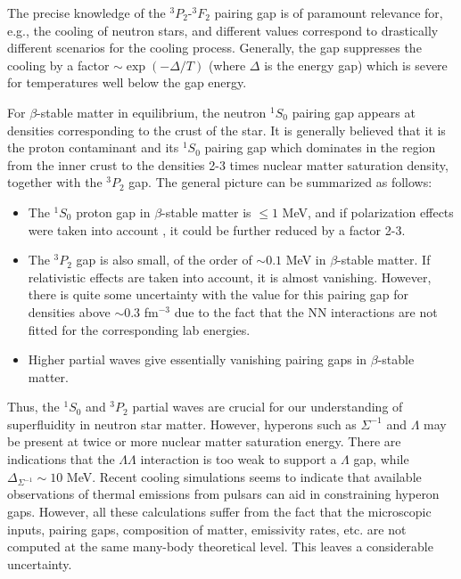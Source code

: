 \documentclass{elsart}
\begin{document}
The precise knowledge of the $^3P_2$-$^3F_2$ pairing gap is of 
paramount relevance for, e.g.,  the cooling of neutron stars, 
and different values correspond to drastically
different scenarios for the cooling process.
Generally, the gap suppresses the cooling by a factor
$\sim\exp(-\Delta/T)$ (where $\Delta$ is the energy gap)
which is severe for
temperatures well below the gap energy.

For $\beta$-stable matter in equilibrium, the neutron
$^1S_0$ pairing gap appears at densities corresponding to the crust 
of the star. It is generally believed that it is the
proton contaminant and its $^1S_0$ pairing gap which dominates
in the region from the inner crust to the densities 2-3 times nuclear matter
saturation density, together with the   $^3P_2$ gap. The general picture
can be summarized as follows:
\begin{itemize}
\item
The $^1S_0$ proton gap in $\beta$-stable matter
            is $ \le 1$ MeV, and if polarization
            effects were taken into account \cite{sclbl96},
            it could be further reduced by a factor 2-3.
\item
The $^3P_2$ gap is also small, of the order
            of $\sim 0.1$ MeV in $\beta$-stable matter.
            If relativistic effects are taken into account,
            it is almost vanishing. However, there is
            quite some uncertainty with the value for this
            pairing gap for densities above $\sim 0.3$
            fm$^{-3}$ due to the fact that the NN interactions
            are not fitted for the corresponding lab energies. 
\item
Higher partial waves give essentially vanishing
            pairing gaps in $\beta$-stable matter.
\end{itemize}
Thus, the $^1S_0$ and $^3P_2$ partial waves are crucial for our
understanding of superfluidity in neutron star matter. However,
hyperons such as $\Sigma^{-1}$ and $\Lambda$ may be present at twice or more
nuclear matter saturation energy. 
There are indications that the $\Lambda\Lambda$ interaction is too weak
to support a $\Lambda$ gap, while $\Delta_{\Sigma^{-1}}\sim 10$ MeV. 
Recent cooling simulations seems to indicate
that available observations of thermal emissions from pulsars can aid
in constraining hyperon gaps. However, all these calculations suffer from the
fact that the microscopic inputs, pairing gaps, composition of matter, emissivity rates, etc.
are not computed at the same many-body theoretical level. This leaves a 
considerable uncertainty. 
\end{document}
